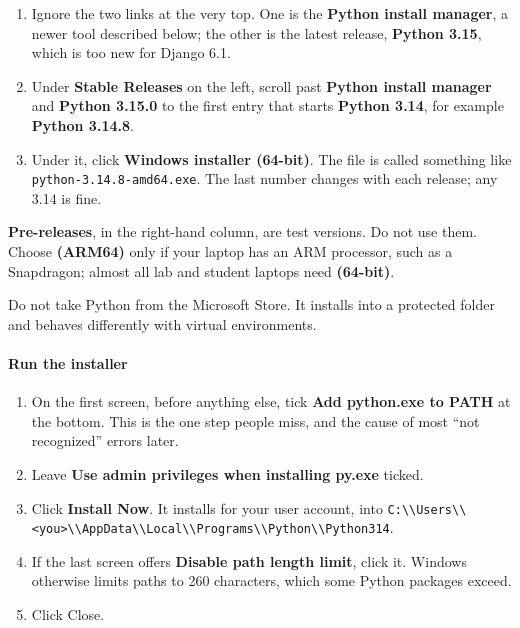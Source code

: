 \documentclass{article}
\newcommand{\cd}[1]{\texttt{#1}}
\newcommand{\cdb}[1]{\nolinkurl{#1}}
\begin{document}
\begin{enumerate}
  \item Ignore the two links at the very top. One is the
        \textbf{Python install manager}, a newer tool described below;
        the other is the latest release, \textbf{Python 3.15}, which is
        too new for Django 6.1.
  \item Under \textbf{Stable Releases} on the left, scroll past
        \textbf{Python install manager} and \textbf{Python 3.15.0} to the
        first entry that starts \textbf{Python 3.14}, for example
        \textbf{Python 3.14.8}.
  \item Under it, click \textbf{Windows installer (64-bit)}. The file is
        called something like \cd{python-3.14.8-amd64.exe}. The last
        number changes with each release; any 3.14 is fine.
\end{enumerate}

\textbf{Pre-releases}, in the right-hand column, are test versions. Do not
use them. Choose \textbf{(ARM64)} only if your laptop has an ARM
processor, such as a Snapdragon; almost all lab and student laptops need
\textbf{(64-bit)}.

Do not take Python from the Microsoft Store. It installs into a
protected folder and behaves differently with virtual environments.

\paragraph{Run the installer}

\begin{enumerate}
  \item On the first screen, before anything else, tick
        \textbf{Add python.exe to PATH} at the bottom. This is the one
        step people miss, and the cause of most ``not recognized''
        errors later.
  \item Leave \textbf{Use admin privileges when installing py.exe}
        ticked.
  \item Click \textbf{Install Now}. It installs for your user account,
        into \cdb{C:\\Users\\<you>\\AppData\\Local\\Programs\\Python\\Python314}.
  \item If the last screen offers \textbf{Disable path length limit},
        click it. Windows otherwise limits paths to 260 characters,
        which some Python packages exceed.
  \item Click Close.
\end{enumerate}
\end{document}
